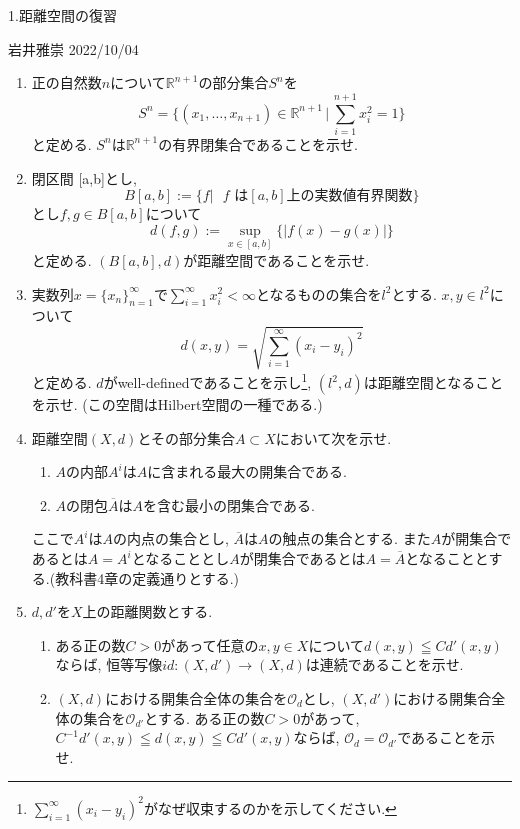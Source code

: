 \documentclass[dvipdfmx,a4paper,11pt]{article}
\newcommand{\R}{\mathbb{R}}
\theoremstyle{definition}
\begin{document}



\begin{center}
{\Large 1.距離空間の復習}
\end{center}
\begin{flushright}
 岩井雅崇 2022/10/04
\end{flushright}

\begin{enumerate}[label=\textbf{問}1.\arabic*]
\item 正の自然数$n$について$\R^{n+1}$の部分集合$S^n$を
$$
S^n = \{ (x_1, \ldots, x_{n+1}) \in \R^{n+1} \, |\,\sum_{i=1}^{n+1} x_{i}^{2} =1\}
$$
と定める. $S^n$は$\R^{n+1}$の有界閉集合であることを示せ.
\item 閉区間 [a,b]とし, 
$$
B[a,b]:= \{f | \text{ $f$ は$[a,b]$上の実数値有界関数} \}
$$
とし$f,g \in B[a,b]$について
$$
d(f,g) := \sup_{x \in [a,b]} \{ |f(x) - g(x)|\}
$$
と定める.  $(B[a,b],d)$が距離空間であることを示せ.


 \item  実数列$x = \{ x_n\}_{n=1}^{\infty}$で$\sum_{i=1}^{\infty} x_{i}^{2} < \infty$となるものの集合を$l^2$とする.
 $x,y \in l^2$について
 $$
 d(x,y) = \sqrt{ \sum_{i=1}^{\infty} (x_i - y_i)^2}
 $$
 と定める. $d$がwell-definedであることを示し\footnote{$\sum_{i=1}^{\infty} (x_i - y_i)^2$がなぜ収束するのかを示してください.}, $(l^2,d)$は距離空間となることを示せ. (この空間はHilbert空間の一種である.)
 

  
 \item 距離空間$(X,d)$とその部分集合$A \subset X$において次を示せ.
	 \begin{enumerate}
 	\item $A$の内部$A^i$は$A$に含まれる最大の開集合である.
 	\item $A$の閉包$\overline{A}$は$A$を含む最小の閉集合である.
 	\end{enumerate}
 ここで$A^i$は$A$の内点の集合とし, $\overline{A}$は$A$の触点の集合とする.
 また$A$が開集合であるとは$A = A^i$となることとし$A$が閉集合であるとは$A = \overline{A}$となることとする.(教科書4章の定義通りとする.)
 
\item $d,d'$を$X$上の距離関数とする. 
	\begin{enumerate}
	\item ある正の数$C>0$があって任意の$x,y \in X$について$d(x,y) \leqq Cd'(x,y)$ならば, 恒等写像$id : (X, d') \rightarrow (X,d)$は連続であることを示せ.
	\item $(X,d)$における開集合全体の集合を$\mathscr{O}_d$とし, $(X,d')$における開集合全体の集合を$\mathscr{O}_{d'}$とする. ある正の数$C>0$があって, $C^{-1} d'(x,y)\leqq d(x,y) \leqq Cd'(x,y)$ならば, $\mathscr{O}_d = \mathscr{O}_{d'}$であることを示せ.
	\end{enumerate}


\end{enumerate}
\end{document}
